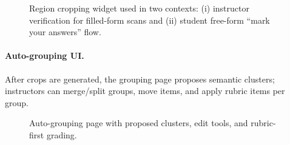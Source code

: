 \documentclass[ms,twoside,print]{nuthesis}
\begin{document}
\begin{figure}[htb]
  \centering
  \caption{Region cropping widget used in two contexts: (i) instructor verification for filled-form scans and (ii) student free-form ``mark your answers'' flow.}
  \label{fig:ui-crops}
\end{figure}

\paragraph{Auto-grouping UI.}
After crops are generated, the grouping page proposes semantic clusters; instructors can merge/split groups, move items, and apply rubric items per group.

\begin{figure}[htb]
  \centering
  \caption{Auto-grouping page with proposed clusters, edit tools, and rubric-first grading.}
  \label{fig:ui-grouping}
\end{figure}
\end{document}
